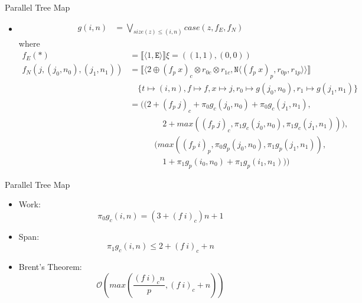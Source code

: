 \documentclass[pdf]{beamer}
\newcommand{\T}[1]{\texttt{#1}}
\newcommand{\LP}{\langle}
\newcommand{\RP}{\rangle}
\newcommand{\LB}{\llbracket}
\newcommand{\RB}{\rrbracket}
\newcommand{\quadthree}{\qquad\quad}
\newcommand{\quadfour}{\quadthree\quad}
\begin{document}
\begin{frame}{Parallel Tree Map}
  \begin{itemize}
    \item
      \footnotesize
\begin{align*}
  g(i,n) &= \bigvee\limits_{size(z) \leq (i,n)} case(z, f_E, f_N)
\end{align*}
where
\begin{align*}
  f_E(\ast) &= \LB \LP 1, \T{E} \RP\RB\xi = ((1, 1), (0, 0)) \\
  f_N(j, (j_0,n_0), (j_1, n_1)) &= \LB \LP 2 \oplus (f_p\ x)_c \otimes r_{0c} \otimes r_{1c}, \T{N} \LP (f_p\ x)_p, r_{0p}, r_{1p}\RP\RP \RB\\
                                &\quad \{t \mapsto (i,n), f \mapsto f, x \mapsto j, r_0 \mapsto g(j_0,n_0), r_1 \mapsto g(j_1,n_1) \} \\
                                &= ((2 + (f_p\ j)_c + \pi_0g_c(j_0,n_0) +\pi_0 g_c(j_1,n_1), \\
                                &\quadfour 2 + max((f_p\ j)_c,\pi_1 g_c(j_0,n_0), \pi_1 g_c(j_1,n_1))),\\
                                &\quadthree (max((f_p\ i)_p, \pi_0 g_p(j_0,n_0), \pi_1 g_p(j_1,n_1)), \\
                                &\quadfour 1 + \pi_1 g_p(i_0,n_0) + \pi_1 g_p(i_1,n_1)))
\end{align*}
  \end{itemize}
\end{frame}

\begin{frame}{Parallel Tree Map}
  \begin{itemize}
    \vfill
    \item Work:\hfill \\
      \[\pi_0 g_c(i,n) = (3 + (f\ i)_c)n + 1\]
    \vfill
    \item Span:\hfill \\
      \[\pi_1 g_c(i,n) \leq 2 + (f\ i)_c + n\]
    \vfill
    \item Brent's Theorem:\hfill \\
      \[ \mathcal{O}(max\left(\frac{(f\ i)_c n}{p}, (f\ i)_c + n\right)) \]
  \end{itemize}

\end{frame}
\end{document}
